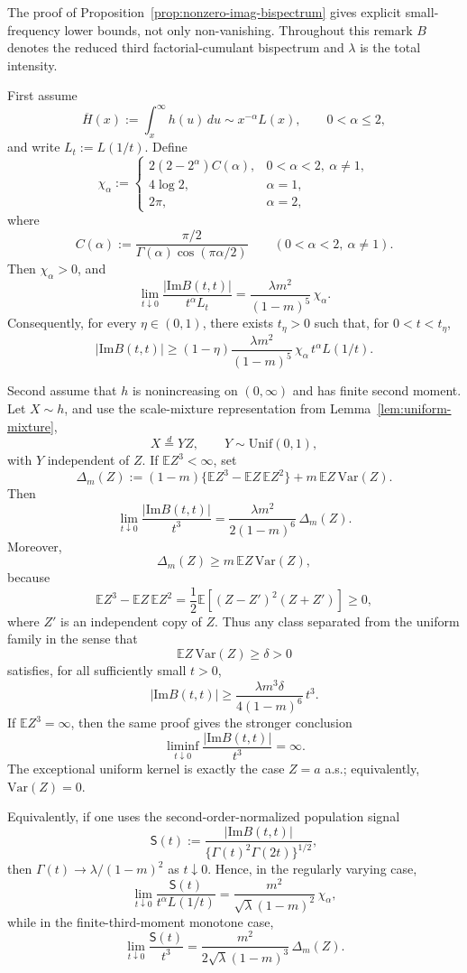 \documentclass[aap,press]{apt} \volno{00} \partno{00}
\newcommand{\E}{\mathbb{E}}
\newcommand{\1}{\mathbf{1}}
\newcommand{\Imm}{\mathrm{Im}}
\numberwithin{equation}{section}
\begin{document}
\begin{rem}\label{rem:small-frequency-lower-bounds}
The proof of Proposition~\ref{prop:nonzero-imag-bispectrum} gives explicit small-frequency lower bounds, not only non-vanishing. Throughout this remark $B$ denotes the reduced third factorial-cumulant bispectrum and $\lambda$ is the total intensity.

First assume
\[
\overline H(x):=\int_x^\infty h(u)\,du\sim x^{-\alpha}L(x),
\qquad 0<\alpha\le 2,
\]
and write $L_t:=L(1/t)$. Define
\[
\chi_\alpha:=
\begin{cases}
2(2-2^\alpha)C(\alpha), & 0<\alpha<2,\ \alpha\ne1,\\[3pt]
4\log 2, & \alpha=1,\\[3pt]
2\pi, & \alpha=2,
\end{cases}
\]
where
\[
C(\alpha):=\frac{\pi/2}{\Gamma(\alpha)\cos(\pi\alpha/2)}
\qquad (0<\alpha<2,\ \alpha\ne1).
\]
Then $\chi_\alpha>0$, and
\[
\lim_{t\downarrow0}
\frac{|\Imm B(t,t)|}{t^\alpha L_t}
=
\frac{\lambda m^2}{(1-m)^5}\,\chi_\alpha .
\]
Consequently, for every $\eta\in(0,1)$, there exists $t_\eta>0$ such that, for $0<t<t_\eta$,
\[
|\Imm B(t,t)|
\ge
(1-\eta)\frac{\lambda m^2}{(1-m)^5}\,
\chi_\alpha\,t^\alpha L(1/t).
\]

Second assume that $h$ is nonincreasing on $(0,\infty)$ and has finite second moment. Let $X\sim h$, and use the scale-mixture representation from Lemma~\ref{lem:uniform-mixture},
\[
X\stackrel d=YZ,
\qquad
Y\sim\mathrm{Unif}(0,1),
\]
with $Y$ independent of $Z$. If $\E Z^3<\infty$, set
\[
\Delta_m(Z)
:=
(1-m)\{\E Z^3-\E Z\,\E Z^2\}
+
m\,\E Z\,\mathrm{Var}(Z).
\]
Then
\[
\lim_{t\downarrow0}
\frac{|\Imm B(t,t)|}{t^3}
=
\frac{\lambda m^2}{2(1-m)^6}\,\Delta_m(Z).
\]
Moreover,
\[
\Delta_m(Z)\ge m\,\E Z\,\mathrm{Var}(Z),
\]
because
\[
\E Z^3-\E Z\,\E Z^2
=
\frac12\E[(Z-Z')^2(Z+Z')]\ge0,
\]
where $Z'$ is an independent copy of $Z$. Thus any class separated from the uniform family in the sense that
\[
\E Z\,\mathrm{Var}(Z)\ge \delta>0
\]
satisfies, for all sufficiently small $t>0$,
\[
|\Imm B(t,t)|
\ge
\frac{\lambda m^3\delta}{4(1-m)^6}\,t^3 .
\]
If $\E Z^3=\infty$, then the same proof gives the stronger conclusion
\[
\liminf_{t\downarrow0}
\frac{|\Imm B(t,t)|}{t^3}
=
\infty .
\]
The exceptional uniform kernel is exactly the case $Z=a$ a.s.; equivalently, $\mathrm{Var}(Z)=0$.

Equivalently, if one uses the second-order-normalized population signal
\[
\mathsf S(t):=
\frac{|\Imm B(t,t)|}{\{\Gamma(t)^2\Gamma(2t)\}^{1/2}},
\]
then $\Gamma(t)\to \lambda/(1-m)^2$ as $t\downarrow0$. Hence, in the regularly varying case,
\[
\lim_{t\downarrow0}
\frac{\mathsf S(t)}{t^\alpha L(1/t)}
=
\frac{m^2}{\sqrt{\lambda}(1-m)^2}\,\chi_\alpha,
\]
while in the finite-third-moment monotone case,
\[
\lim_{t\downarrow0}
\frac{\mathsf S(t)}{t^3}
=
\frac{m^2}{2\sqrt{\lambda}(1-m)^3}\,\Delta_m(Z).
\]
\end{rem}
\end{document}
